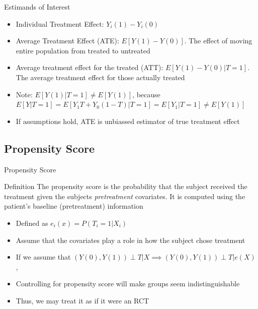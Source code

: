 \begin{frame}{Estimands of Interest}
 \begin{itemize}
 \item Individual Treatment Effect: $Y_i(1)-Y_i(0)$
 \item Average Treatment Effect (ATE): $E[Y(1)-Y(0)]$. The effect of moving entire population
 from treated to untreated
 \item Average treatment effect for the treated (ATT): $E[Y(1)-Y(0)|T=1]$. The average treatment
 effect for those actually treated
 \item Note:  $E[Y(1)|T=1]\neq E[Y(1)]$, because $E[Y|T=1]=E[Y_1T+Y_0(1-T)|T=1]=E[Y_1|T=1]\neq E[Y(1)]$
\item If assumptions hold, ATE is unbiassed estimator of true treatment effect
 \end{itemize}
 
\end{frame}

\subsection{Propensity Score}
\begin{frame}{Propensity Score}
\begin{block}{Definition}
The propensity score is the probability that the subject received the treatment given the subjects \textit{pretreatment}
covariates. It is computed using the patient's baseline (pretreatment) information \cite{Rosenbaum1983}
\end{block}
 \begin{itemize}
  \item Defined as  $e_i(x)=P(T_i =1 |X_i)$
  \item Assume that the covariates play a role in how the subject chose treatment
  \item If we assume that $(Y(0),Y(1))\perp T|X \implies (Y(0),Y(1))\perp T|e(X)$, \cite{Rosenbaum1983}
  \item Controlling for propensity score will make groups seem indistinguishable
  \item Thus, we may treat it as if it were an RCT
 \end{itemize}

\end{frame}

